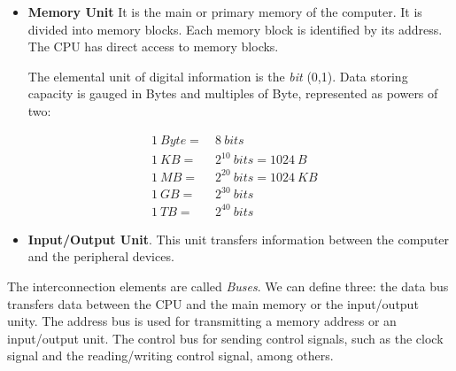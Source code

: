 \begin{paracol}{2}
\begin{itemize}
\item \textbf{Memory Unit} It is the main or primary memory of the computer. It is divided into memory blocks. Each memory block is identified by its address. The CPU has direct access to memory blocks.

The elemental unit of digital information is the \emph{bit} (0,1). Data storing capacity is gauged in Bytes  and multiples of Byte, represented as powers of two:

\begin{align} \nonumber
1\  Byte = &\ 8\ bits\ &\  \\ \nonumber
1\  KB  = &\ 2^{10}\ bits=1024\ B&\ \\  \nonumber
1\  MB = &\ 2^{20}\ bits=1024\ KB&\ \\  \nonumber
1\  GB = &\ 2^{30}\ bits &\ \\  \nonumber
1\  TB  = &\ 2^{40}\ bits\ &\
\end{align} 

\item \textbf{Input/Output Unit}. This unit transfers information between the computer and the peripheral devices.
\end{itemize}

The interconnection elements are called \emph{Buses}. We can define three: the data bus transfers data between the CPU and the main memory or the input/output unity. The address bus is used for transmitting a memory address or an input/output unit. The control bus for sending control signals, such as the clock signal and the reading/writing control signal, among others.     
\end{paracol} 


